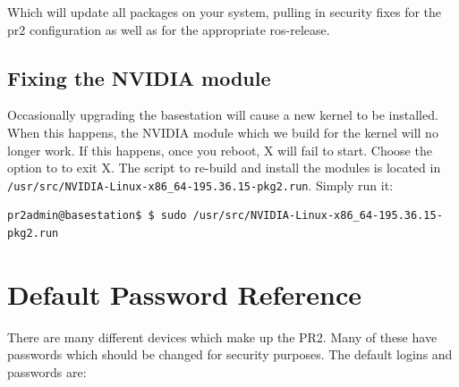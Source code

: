 Which will update all packages on your system, pulling in security fixes for
the pr2 configuration as well as for the appropriate ros-release.

\subsection{Fixing the NVIDIA module}

Occasionally upgrading the basestation will cause a new kernel to be
installed. When this happens, the NVIDIA module which we build for the
kernel will no longer work.  If this happens, once you reboot, X will
fail to start.  Choose the option to to exit X.  The script to
re-build and install the modules is located in
\texttt{/usr/src/NVIDIA-Linux-x86\_64-195.36.15-pkg2.run}.  Simply run it:

\begin{verbatim}
pr2admin@basestation$ $ sudo /usr/src/NVIDIA-Linux-x86_64-195.36.15-pkg2.run 
\end{verbatim}



\section{Default Password Reference}
There are many different devices which make up the PR2.  Many of these
have passwords which should be changed for security purposes.  The
default logins and passwords are:

